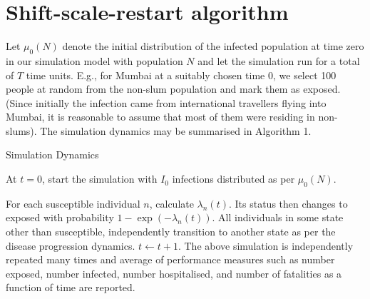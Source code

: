 \documentclass{article}
\theoremstyle{definition}
\begin{document}
 
 
\section{Shift-scale-restart algorithm} 
\label{ssr_algo}


Let $\mu_0(N)$ denote the initial distribution of the infected population at time zero in our simulation model with population $N$
and let the  simulation run for a total of $T$ time units.  E.g., for Mumbai at a suitably chosen time 0, we select 100 people at random from the
non-slum population and mark them as exposed. (Since initially the infection came from international travellers flying into Mumbai, it is reasonable to assume that most of them were residing in non-slums).   
The simulation dynamics may be summarised in Algorithm 1. 
\begin{algorithm}
\caption{Simulation Dynamics}\label{alg:base}
\begin{algorithmic}[1]
 \State  At $t=0$, start the simulation with $I_0$ infections distributed as per $\mu_0(N)$. 
 
 \State For each susceptible individual
 $n$, calculate $\lambda_n(t)$.  Its status then changes to exposed 
 with probability $1-\exp({-\lambda_n(t)})$.
 \State All individuals in some state other than susceptible, independently transition to another state as per the disease progression 
 dynamics. 
 \State $t \gets t+1$.
 \EndWhile
 \State The above simulation is independently repeated many times and average of performance measures such as number exposed, number infected, number hospitalised, and number of fatalities as a function of time are reported.
\end{algorithmic}
\end{algorithm}
\end{document}
